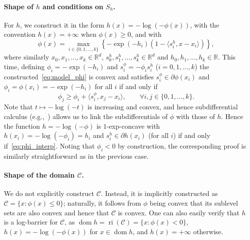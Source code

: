 \documentclass[a4paper]{article}
\renewcommand{\leq}{\leqslant}
\renewcommand{\geq}{\geqslant}
\newcommand{\CC}{\mathcal{C}}
\newcommand{\R}{\mathbb{R}}
\newcommand{\ip}[2]{\langle #1, #2\rangle}
\DeclareMathOperator{\dom}{dom}
\DeclareMathOperator{\ri}{ri}
\begin{document}
\paragraph{Shape of $h$ and conditions on $S_h$.}
For $h$, we construct it in the form $h(x)=-\log(-\phi(x))$, with the convention $h(x)=+\infty$ when $\phi(x)\geq 0$, and with
\begin{equation}\label{eq:model_phi}
        \phi(x)
    =
    \max_{i\in\{0,1,\ldots,k\}} \left\{-\exp(-h_i)\left(1-\ip{s_i^{h}}{x-x_i}\right) \right\},
\end{equation}
where similarly $x_0,x_1,\ldots,x_k\in\R^d$, $s^{h}_0,s^{h}_1,\ldots,s^{h}_k\in\R^d$ and $h_0,h_1,\ldots,h_k\in\R$.
This time, defining $\phi_i=-\exp(-h_i)$ and $s^{\phi}_i=-\phi_i s^h_i$ ($i=0,1,\ldots,k$) the constructed~\eqref{eq:model_phi} is convex and satisfies $s_i^{\phi}\in\partial \phi(x_i)$ and $\phi_i=\phi(x_i)=-\exp(-h_i)$ for all $i$ if and only if
\begin{equation}\label{eq:phi_interp}
        \phi_j\geq \phi_i+\ip{s_i^\phi}{x_j-x_i},
        \qquad \forall i,j\in\{0,1,\ldots,k\}.
\end{equation}
Note that $t\mapsto -\log(-t)$ is increasing and convex, and hence subdifferential calculus (e.g.,~\cite[Theorem 4.3.1]{hiriart2013convex}) allows us to link the subdifferentials of $\phi$ with those of $h$.
Hence the function $h=-\log(-\phi)$ is $1$-exp-concave with $h(x_i)=-\log(-\phi_i)=h_i$ and $s_i^h\in\partial h(x_i)$ (for all $i$) if and only if~\eqref{eq:phi_interp}.
Noting that $\phi_i<0$ by construction, the corresponding proof is similarly straightforward as in the previous case.

\paragraph{Shape of the domain $\CC$.}
We do not explicitly construct $\CC$.
Instead, it is implicitly constructed as $\CC = \{x\colon\phi(x)\leq 0\}$; naturally, it follows from \(\phi\) being convex that its sublevel sets are also convex and hence that $\CC$ is convex.
One can also easily verify that $h$ is a log-barrier for $\CC$, as $\dom h = \ri(\CC) = \{x\colon\phi(x)<0\}$, $h(x) =  -\log(-\phi(x))$ for $x\in\dom h$,
and \(h(x)=+\infty\) otherwise.
\end{document}
